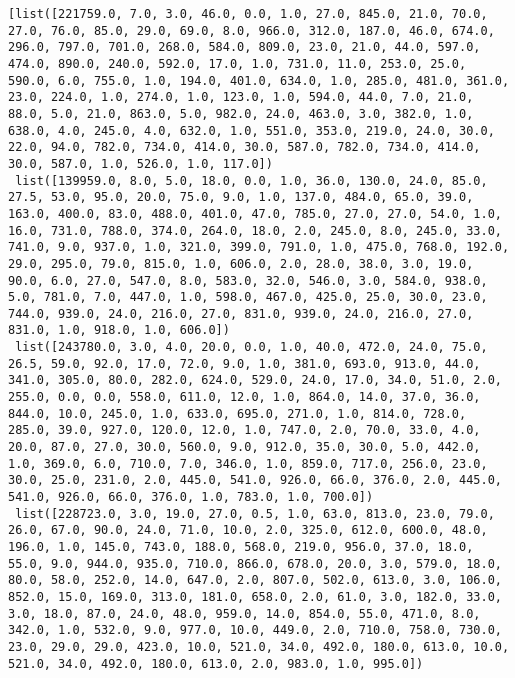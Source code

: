 \documentclass[11pt]{article}
\begin{document}
    \begin{Verbatim}[commandchars=\\\{\}]
[list([221759.0, 7.0, 3.0, 46.0, 0.0, 1.0, 27.0, 845.0, 21.0, 70.0, 27.0, 76.0, 85.0, 29.0, 69.0, 8.0, 966.0, 312.0, 187.0, 46.0, 674.0, 296.0, 797.0, 701.0, 268.0, 584.0, 809.0, 23.0, 21.0, 44.0, 597.0, 474.0, 890.0, 240.0, 592.0, 17.0, 1.0, 731.0, 11.0, 253.0, 25.0, 590.0, 6.0, 755.0, 1.0, 194.0, 401.0, 634.0, 1.0, 285.0, 481.0, 361.0, 23.0, 224.0, 1.0, 274.0, 1.0, 123.0, 1.0, 594.0, 44.0, 7.0, 21.0, 88.0, 5.0, 21.0, 863.0, 5.0, 982.0, 24.0, 463.0, 3.0, 382.0, 1.0, 638.0, 4.0, 245.0, 4.0, 632.0, 1.0, 551.0, 353.0, 219.0, 24.0, 30.0, 22.0, 94.0, 782.0, 734.0, 414.0, 30.0, 587.0, 782.0, 734.0, 414.0, 30.0, 587.0, 1.0, 526.0, 1.0, 117.0])
 list([139959.0, 8.0, 5.0, 18.0, 0.0, 1.0, 36.0, 130.0, 24.0, 85.0, 27.5, 53.0, 95.0, 20.0, 75.0, 9.0, 1.0, 137.0, 484.0, 65.0, 39.0, 163.0, 400.0, 83.0, 488.0, 401.0, 47.0, 785.0, 27.0, 27.0, 54.0, 1.0, 16.0, 731.0, 788.0, 374.0, 264.0, 18.0, 2.0, 245.0, 8.0, 245.0, 33.0, 741.0, 9.0, 937.0, 1.0, 321.0, 399.0, 791.0, 1.0, 475.0, 768.0, 192.0, 29.0, 295.0, 79.0, 815.0, 1.0, 606.0, 2.0, 28.0, 38.0, 3.0, 19.0, 90.0, 6.0, 27.0, 547.0, 8.0, 583.0, 32.0, 546.0, 3.0, 584.0, 938.0, 5.0, 781.0, 7.0, 447.0, 1.0, 598.0, 467.0, 425.0, 25.0, 30.0, 23.0, 744.0, 939.0, 24.0, 216.0, 27.0, 831.0, 939.0, 24.0, 216.0, 27.0, 831.0, 1.0, 918.0, 1.0, 606.0])
 list([243780.0, 3.0, 4.0, 20.0, 0.0, 1.0, 40.0, 472.0, 24.0, 75.0, 26.5, 59.0, 92.0, 17.0, 72.0, 9.0, 1.0, 381.0, 693.0, 913.0, 44.0, 341.0, 305.0, 80.0, 282.0, 624.0, 529.0, 24.0, 17.0, 34.0, 51.0, 2.0, 255.0, 0.0, 0.0, 558.0, 611.0, 12.0, 1.0, 864.0, 14.0, 37.0, 36.0, 844.0, 10.0, 245.0, 1.0, 633.0, 695.0, 271.0, 1.0, 814.0, 728.0, 285.0, 39.0, 927.0, 120.0, 12.0, 1.0, 747.0, 2.0, 70.0, 33.0, 4.0, 20.0, 87.0, 27.0, 30.0, 560.0, 9.0, 912.0, 35.0, 30.0, 5.0, 442.0, 1.0, 369.0, 6.0, 710.0, 7.0, 346.0, 1.0, 859.0, 717.0, 256.0, 23.0, 30.0, 25.0, 231.0, 2.0, 445.0, 541.0, 926.0, 66.0, 376.0, 2.0, 445.0, 541.0, 926.0, 66.0, 376.0, 1.0, 783.0, 1.0, 700.0])
 list([228723.0, 3.0, 19.0, 27.0, 0.5, 1.0, 63.0, 813.0, 23.0, 79.0, 26.0, 67.0, 90.0, 24.0, 71.0, 10.0, 2.0, 325.0, 612.0, 600.0, 48.0, 196.0, 1.0, 145.0, 743.0, 188.0, 568.0, 219.0, 956.0, 37.0, 18.0, 55.0, 9.0, 944.0, 935.0, 710.0, 866.0, 678.0, 20.0, 3.0, 579.0, 18.0, 80.0, 58.0, 252.0, 14.0, 647.0, 2.0, 807.0, 502.0, 613.0, 3.0, 106.0, 852.0, 15.0, 169.0, 313.0, 181.0, 658.0, 2.0, 61.0, 3.0, 182.0, 33.0, 3.0, 18.0, 87.0, 24.0, 48.0, 959.0, 14.0, 854.0, 55.0, 471.0, 8.0, 342.0, 1.0, 532.0, 9.0, 977.0, 10.0, 449.0, 2.0, 710.0, 758.0, 730.0, 23.0, 29.0, 29.0, 423.0, 10.0, 521.0, 34.0, 492.0, 180.0, 613.0, 10.0, 521.0, 34.0, 492.0, 180.0, 613.0, 2.0, 983.0, 1.0, 995.0])

\end{Verbatim}
\end{document}
